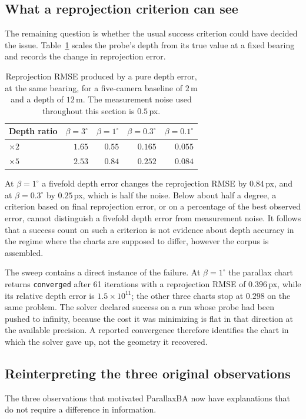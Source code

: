\documentclass[11pt,a4paper]{article}
\theoremstyle{definition}
\theoremstyle{remark}
\begin{document}
\subsection{What a reprojection criterion can see}
\label{sec:depth-blind}
The remaining question is whether the usual success criterion could have decided the issue. Table~\ref{tab:depth-blind} scales the probe's depth from its true value at a fixed bearing and records the change in reprojection error.

\begin{table}[t]
\centering
\caption{Reprojection RMSE produced by a pure depth error, at the same bearing, for a five-camera baseline of $2$\,m and a depth of $12$\,m. The measurement noise used throughout this section is $0.5$\,px.}
\label{tab:depth-blind}
\small
\begin{tabular}{lrrrr}
\toprule
Depth ratio & $\beta=3^\circ$ & $\beta=1^\circ$ & $\beta=0.3^\circ$ & $\beta=0.1^\circ$\\
\midrule
$\times2$ & $1.65$ & $0.55$ & $0.165$ & $0.055$\\
$\times5$ & $2.53$ & $0.84$ & $0.252$ & $0.084$\\
\bottomrule
\end{tabular}
\end{table}

At $\beta=1^\circ$ a fivefold depth error changes the reprojection RMSE by $0.84$\,px, and at $\beta=0.3^\circ$ by $0.25$\,px, which is half the noise. Below about half a degree, a criterion based on final reprojection error, or on a percentage of the best observed error, cannot distinguish a fivefold depth error from measurement noise. It follows that a success count on such a criterion is not evidence about depth accuracy in the regime where the charts are supposed to differ, however the corpus is assembled.

The sweep contains a direct instance of the failure. At $\beta=1^\circ$ the parallax chart returns \texttt{converged} after 61 iterations with a reprojection RMSE of $0.396$\,px, while its relative depth error is $1.5\times10^{11}$; the other three charts stop at $0.298$ on the same problem. The solver declared success on a run whose probe had been pushed to infinity, because the cost it was minimizing is flat in that direction at the available precision. A reported convergence therefore identifies the chart in which the solver gave up, not the geometry it recovered.

\subsection{Reinterpreting the three original observations}
The three observations that motivated ParallaxBA now have explanations that do not require a difference in information.
\end{document}
